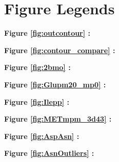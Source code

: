 \section{Figure Legends}

\textbf{Figure \ref{fig:outcontour} : } \FigOneCaption
\newline

\noindent
\textbf{Figure \ref{fig:contour_compare} : } \FigTwoCaption
\newline

\noindent
\textbf{Figure \ref{fig:2bmo} : } \FigThreeCaption
\newline

\noindent
\textbf{Figure \ref{fig:Glupm20_mp0} : } \FigFourCaption
\newline

\noindent
\textbf{Figure \ref{fig:Ilepp} : } \FigFiveCaption
\newline

\noindent
\textbf{Figure \ref{fig:METmpm_3d43} : } \FigSixCaption
\newline

\noindent
\textbf{Figure \ref{fig:AspAsn} : } \FigSevenCaption
\newline

\noindent
\textbf{Figure \ref{fig:AsnOutliers} : } \FigEightCaption
\newline

